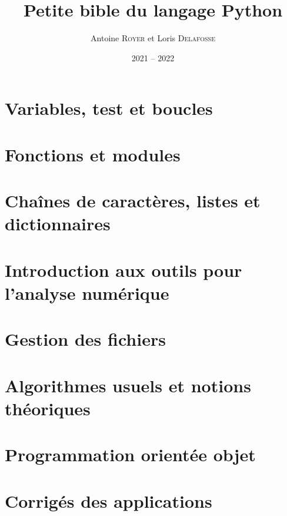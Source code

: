 \documentclass[french, a4paper, 12pt, openany]{book}
\title{\sc Petite bible du langage Python}
\author{Antoine \textsc{Royer} et Loris \textsc{Delafosse}}
\date{2021 -- 2022}
\begin{document}
 \maketitle \tableofcontents

	\chapter{Variables, test et boucles} \label{chap_1}
		
	
	\chapter{Fonctions et modules}
		
	
	\chapter{Chaînes de caractères, listes et dictionnaires}
		
	
	\chapter{Introduction aux outils pour l'analyse numérique} \label{chap_4}
		
	
	\chapter{Gestion des fichiers}
		
	
	\chapter{Algorithmes usuels et notions théoriques}
		
	
	\chapter{Programmation orientée objet}
		
	
	\chapter{Corrigés des applications}
		
\end{document}

